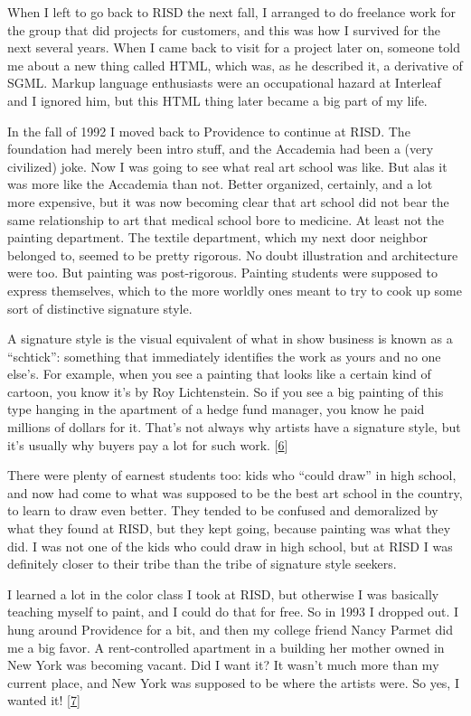 When I left to go back to RISD the next fall, I arranged to do freelance
work for the group that did projects for customers, and this was how I
survived for the next several years. When I came back to visit for a
project later on, someone told me about a new thing called HTML, which
was, as he described it, a derivative of SGML. Markup language
enthusiasts were an occupational hazard at Interleaf and I ignored him,
but this HTML thing later became a big part of my life.

In the fall of 1992 I moved back to Providence to continue at RISD. The
foundation had merely been intro stuff, and the Accademia had been a
(very civilized) joke. Now I was going to see what real art school was
like. But alas it was more like the Accademia than not. Better
organized, certainly, and a lot more expensive, but it was now becoming
clear that art school did not bear the same relationship to art that
medical school bore to medicine. At least not the painting department.
The textile department, which my next door neighbor belonged to, seemed
to be pretty rigorous. No doubt illustration and architecture were too.
But painting was post-rigorous. Painting students were supposed to
express themselves, which to the more worldly ones meant to try to cook
up some sort of distinctive signature style.

A signature style is the visual equivalent of what in show business is
known as a ``schtick'': something that immediately identifies the work
as yours and no one else's. For example, when you see a painting that
looks like a certain kind of cartoon, you know it's by Roy Lichtenstein.
So if you see a big painting of this type hanging in the apartment of a
hedge fund manager, you know he paid millions of dollars for it. That's
not always why artists have a signature style, but it's usually why
buyers pay a lot for such work. {[}\hyperref[f6n]{6}{]}

There were plenty of earnest students too: kids who ``could draw'' in
high school, and now had come to what was supposed to be the best art
school in the country, to learn to draw even better. They tended to be
confused and demoralized by what they found at RISD, but they kept
going, because painting was what they did. I was not one of the kids who
could draw in high school, but at RISD I was definitely closer to their
tribe than the tribe of signature style seekers.

I learned a lot in the color class I took at RISD, but otherwise I was
basically teaching myself to paint, and I could do that for free. So in
1993 I dropped out. I hung around Providence for a bit, and then my
college friend Nancy Parmet did me a big favor. A rent-controlled
apartment in a building her mother owned in New York was becoming
vacant. Did I want it? It wasn't much more than my current place, and
New York was supposed to be where the artists were. So yes, I wanted it!
{[}\hyperref[f7n]{7}{]}

